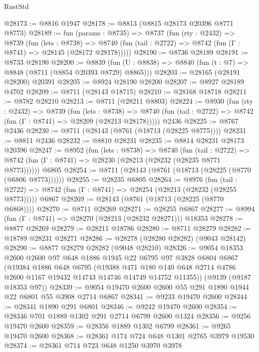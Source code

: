 \begin{lexlean}{RustStd}
\begin{coremodule}
@28173 := @8816 @1947
@28178 := @8813 (@8815 @28173 @20396 @8771 @8773)
@28189 := fun (params : @8735) =>
  @8737
    (fun (rty : @2432) =>
    @8739
      (fun (lets : @8738) =>
      @8740 (fun (tail : @2722) => @8742 (fun (Γ : @8741) => @28145 (@28172 @28178)))))
@28190 := @8736 @28189
@28191 := @8733 @28190
@28200 := @8839
    (fun (U : @8838) => @8840 (fun (t : @7) => @8848 (@8711 (@8854 @20393 @8729) @8865)))
@28203 := @28165 (@28191 @28200) @20391
@28205 := @8924 @28190 @28200
@28207 := @8927 @28189 @4702
@28209 := @8711 (@28143 @18715)
@28210 := @28168 @18718
@28211 := @8782 @28210
@28213 := @8711 (@28211 @8803)
@28224 := @8930
    (fun (rty : @2432) =>
    @8739
      (fun (lets : @8738) =>
      @8740 (fun (tail : @2722) => @8742 (fun (Γ : @8741) => @28209 (@28213 @28178)))))
    @2436
@28225 := @8767 @2436
@28230 := @8711 (@28143 (@8761 (@18713 (@28225 @8775))))
@28231 := @8811 @2436
@28232 := @8810 @28231
@28235 := @8814 @28231 @28173 @20396
@28247 := @8952
    (fun (lets : @8738) =>
    @8740
      (fun (tail : @2722) =>
      @8742 (fun (Γ : @8741) => @28230 (@28213 (@28232 (@28235 @8771 @8773))))))
    @6805
@28254 := @8711 (@28143 (@8761 (@18713 (@28225 (@8770 (@6806 @8773))))))
@28255 := @28235 @6805
@28264 := @8976
    (fun (tail : @2722) => @8742 (fun (Γ : @8741) => @28254 (@28213 (@28232 (@28255 @8773)))))
    @6867
@28269 := @28143 (@8761 (@18713 (@28225 (@8770 @6868))))
@28270 := @8711 @28269
@28271 := @28255 @6867
@28277 := @8994 (fun (Γ : @8741) => @28270 (@28213 (@28232 @28271))) @18353
@28278 := @8877 @28269
@28279 := @28211 @18786
@28280 := @8711 @28279
@28282 := @18789 @28231 @28271
@28286 := @28278 (@28280 @28282) (@9043 @28142)
@28290 := @8877 @28279 @28282 (@9048 @28210)
@28326 := @9054
    @18353
    @2600
    @2600
    @97
    @648
    @1886
    @1945
    @22
    @6795
    @97
    @3828
    @6804
    @6867
    (@19384
      @1886
      @648
      @6795
      (@19388
        @471
        @180
        @140
        @648
        @2714
        @4786
        @2600
        @1167
        @19432
        @14743
        @14746
        @14749
        @14752
        @11355))
    (@9139 (@9187 @18353 @97))
@28339 := @9054 @19470 @2600 @2600 @55 @291 @1890 @1944 @22 @6801 @55 @3908 @2714 @6867
@28341 := @9233 @19470 @2600
@28344 := @28341 @1890 @291 @6801
@28346 := @9242 @19470 @2600
@28354 := @28346 @701 @1889 @1302 @291 @2714 @6799 @2600 @1324
@28356 := @9256 @19470 @2600
@28359 := @28356 @1889 @1302 @6799
@28361 := @9265 @19470 @2600
@28368 := @28361 @174 @724 @648 @1301 @2765 @3979 @19530
@28374 := @28361 @714 @723 @648 @1250 @3970 @3978

\end{coremodule}
\end{lexlean}
